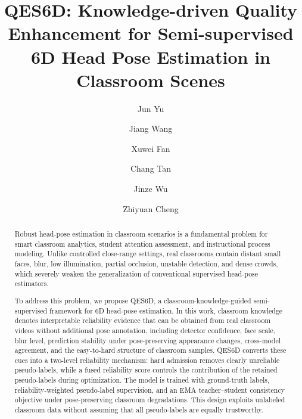 \documentclass[preprint,12pt]{elsarticle}
\begin{document}
\begin{frontmatter}

\title{QES6D: Knowledge-driven Quality Enhancement for Semi-supervised 6D Head Pose Estimation in Classroom Scenes}

\author[inst1,inst2]{Jun Yu}

\author[inst2]{Jiang Wang}

\author[inst3]{Xuwei Fan}

\author[inst1,inst2]{Chang Tan}

\author[inst1,inst2]{Jinze Wu}

\author[inst2]{Zhiyuan Cheng}



\begin{abstract}

Robust head-pose estimation in classroom scenarios is a fundamental problem for smart classroom analytics, student attention assessment, and instructional process modeling. Unlike controlled close-range settings, real classrooms contain distant small faces, blur, low illumination, partial occlusion, unstable detection, and dense crowds, which severely weaken the generalization of conventional supervised head-pose estimators.

To address this problem, we propose QES6D, a classroom-knowledge-guided semi-supervised framework for 6D head-pose estimation. In this work, classroom knowledge denotes interpretable reliability evidence that can be obtained from real classroom videos without additional pose annotation, including detector confidence, face scale, blur level, prediction stability under pose-preserving appearance changes, cross-model agreement, and the easy-to-hard structure of classroom samples. QES6D converts these cues into a two-level reliability mechanism: hard admission removes clearly unreliable pseudo-labels, while a fused reliability score controls the contribution of the retained pseudo-labels during optimization. The model is trained with ground-truth labels, reliability-weighted pseudo-label supervision, and an EMA teacher--student consistency objective under pose-preserving classroom degradations. This design exploits unlabeled classroom data without assuming that all pseudo-labels are equally trustworthy.


\end{abstract}
\end{frontmatter}
\end{document}
